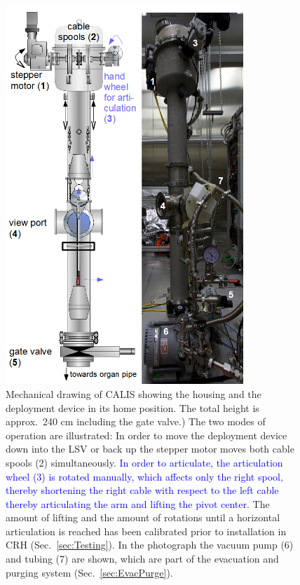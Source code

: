 \begin{figure}[htbp]
 \centering
\includegraphics[width=0.8\textwidth]{Figures/CALIS_overview.png}
 \caption{Mechanical drawing of CALIS showing the housing and the deployment device in its home position. The total height is approx.~240 cm including the gate valve.) The two modes of operation are illustrated: In order to move the deployment device down into the LSV or back up the stepper motor moves both cable spools (2) simultaneously. \textcolor{blue}{In order to articulate, the articulation wheel (3) is rotated manually, which affects only the right spool, thereby shortening the right cable with respect to the left cable thereby articulating the arm and lifting the pivot center.} The amount of lifting and the amount of rotations until a horizontal articulation is reached has been calibrated prior to installation in CRH (Sec.~\ref{sec:Testing}). In the photograph the vacuum pump (6) and tubing (7) are shown, which are part of the evacuation and purging system (Sec.~\ref{sec:EvacPurge}). \label{fig:CALISDimensions}\label{fig:CALISMechanism}\label{fig:gearDrawing}\label{fig:flushing_purging}
}
\end{figure}

